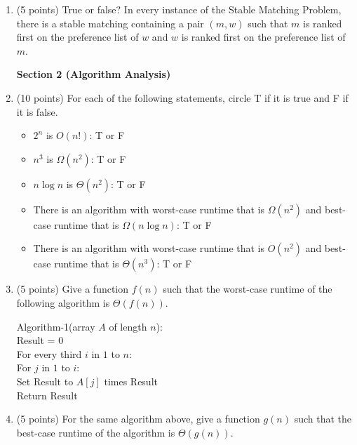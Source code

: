 \documentclass[11pt]{article}
\begin{document}
\begin{enumerate}
\item (5 points) True or false? In every instance of the
 Stable Matching Problem, there is a stable matching containing a pair $(m,w)$
 such that $m$ is ranked first on the preference list of $w$ and $w$ is ranked
 first on the preference list of $m$.

\newpage

\begin{center}
\LARGE\textbf{Section 2 (Algorithm Analysis)\\}%
\end{center}
\item (10 points)
For each of the following statements, circle T if it is true and F if it is false.

\begin{itemize}
    \item $2^n$ is $O(n!)$: T or F
    \item $n^3$ is $\Omega(n^2)$: T or F
    \item $n \log n$ is $\Theta(n^2)$: T or F
    \item There is an algorithm with worst-case runtime that is $\Omega(n^2)$ and best-case runtime that is $\Omega(n \log n)$: T or F
    \item There is an algorithm with worst-case runtime that is $O(n^2)$ and best-case runtime that is $\Theta(n^3)$: T or F
\end{itemize}

\item (5 points) Give a function $f(n)$ such that the worst-case runtime of the following algorithm is $\Theta(f(n))$. 

    \begin{algo}
    Algorithm-1(array $A$ of length $n$):\+\\
    Result = 0\\
    For every third $i$ in $1$ to $n$:\+\\
    For $j$ in $1$ to $i$:\+\\
    Set Result to $A[j]$ times Result\-\- \\
    Return Result\\
    \end{algo} 

    \vspace{1in}

\item (5 points) 
For the same algorithm above, give a function $g(n)$ such that the best-case
runtime of the algorithm is $\Theta(g(n))$.



\end{enumerate}
\end{document}
